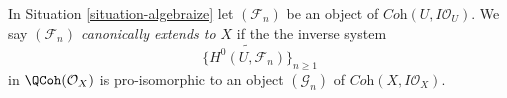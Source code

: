 \begin{definition}
\label{definition-canonically-algebraizable}
In Situation \ref{situation-algebraize} let $(\mathcal{F}_n)$ be an
object of $\textit{Coh}(U, I\mathcal{O}_U)$. We say
{\it $(\mathcal{F}_n)$ canonically extends to $X$} if the the
inverse system
$$
\{\widetilde{H^0(U, \mathcal{F}_n)}\}_{n \geq 1}
$$
in $\QCoh(\mathcal{O}_X)$ is pro-isomorphic to an object
$(\mathcal{G}_n)$ of $\textit{Coh}(X, I\mathcal{O}_X)$.
\end{definition}